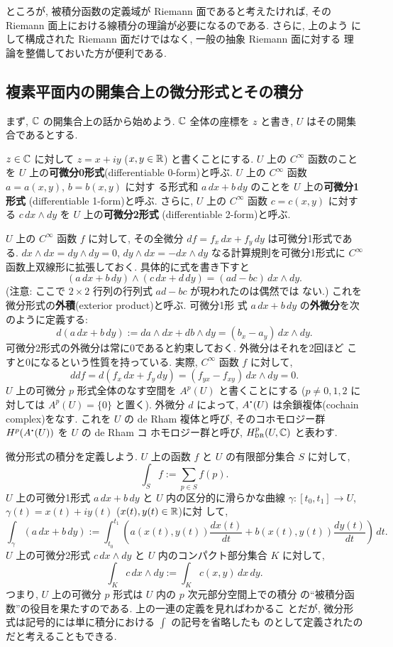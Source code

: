\documentclass[12pt,twoside]{jarticle}
\def\Hdr{H_{\text{\rm DR}}}
\def\bcdot{{\raise0.2ex \hbox{\bf.}}}
\def\bdot{{\raise0.4ex \hbox{\bf.}}}
\def\Hdr{H_{\text{\tiny DR}}}
\def\R{{\Bbb R}} %
\def\C{{\Bbb C}} %
\def\od#1#2{\frac{d #1}{d #2}}
\begin{document}
ところが, 被積分函数の定義域が Riemann 面であると考えたければ, その 
Riemann 面上における線積分の理論が必要になるのである. さらに, 上のよう
にして構成された Riemann 面だけではなく, 一般の抽象 Riemann 面に対する
理論を整備しておいた方が便利である.


\subsection{複素平面内の開集合上の微分形式とその積分}

まず, $\C$ の開集合上の話から始めよう. $\C$ 全体の座標を $z$ と書き,
$U$ はその開集合であるとする.

$z\in\C$ に対して $z=x+iy$ ($x,y\in\R$) と書くことにする. $U$ 上の 
$C^\infty$ 函数のことを $U$ 上の{\bf 可微分0形式}(differentiable
0-form)と呼ぶ. $U$ 上の $C^\infty$ 函数 $a=a(x,y)$, $b=b(x,y)$ に対す
る形式和 $a\,dx + b\,dy$ のことを $U$ 上の{\bf 可微分1形式}
(differentiable 1-form)と呼ぶ. さらに, $U$ 上の $C^\infty$ 函数 
$c=c(x,y)$ に対する $c\,dx\wedge dy$ を $U$ 上の{\bf 可微分2形式}
(differentiable 2-form)と呼ぶ. 

$U$ 上の $C^\infty$ 函数 $f$ に対して, その全微分 $df=f_x\,dx+f_y\,dy$
は可微分1形式である. $dx\wedge dx=dy\wedge dy=0$, %
$dy\wedge dx=-dx\wedge dy$ なる計算規則を可微分1形式に $C^\infty$ %
函数上双線形に拡張しておく. 具体的に式を書き下すと
\[
  (a\,dx+b\,dy)\wedge(c\,dx+d\,dy)
  = (ad-bc)\,dx\wedge dy.
\] %
(注意: ここで $2\times 2$ 行列の行列式 $ad-bc$ が現われたのは偶然では
ない.) これを微分形式の{\bf 外積}(exterior product)と呼ぶ. 可微分1形
式 $a\,dx+b\,dy$ の{\bf 外微分}を次のように定義する:
\[
  d(a\,dx+b\,dy)
  :=da\wedge dx + db\wedge dy
  =(b_x-a_y)\,dx\wedge dy.
\]
可微分2形式の外微分は常に0であると約束しておく. 外微分はそれを2回ほど
こすと0になるという性質を持っている. 実際, $C^\infty$ 函数 $f$ に対して,
\[
  ddf = d(f_x\,dx+f_y\,dy)=(f_{yx}-f_{xy})\,dx\wedge dy = 0.
\] %
$U$ 上の可微分 $p$ 形式全体のなす空間を $A^p(U)$ と書くことにする
($p\ne0,1,2$ に対しては $A^p(U)=\{0\}$ と置く). 外微分 $d$ によって, %
$A^\bdot(U)$ は余鎖複体(cochain complex)をなす. これを $U$ の de Rham
複体と呼び, そのコホモロジー群 $H^p(A^\bcdot(U))$ を $U$ の de Rham コ
ホモロジー群と呼び, $\Hdr^p(U,\C)$ と表わす.

微分形式の積分を定義しよう. $U$ 上の函数 $f$ と $U$ の有限部分集合 $S$
に対して,
\[
  \int_S f := \sum_{p\in S} f(p).
\] %
$U$ 上の可微分1形式 $a\,dx+b\,dy$ と $U$ 内の区分的に滑らかな曲線 %
$\gamma:[t_0,t_1]\to U$, $\gamma(t)=x(t)+iy(t)$ ($x(t),y(t)\in\R$)に対
して,
\[
  \int_\gamma (a\,dx+b\,dy)
  := \int_{t_0}^{t_1}
     \left(
       a(x(t),y(t))\od{x(t)}{t} +
       b(x(t),y(t))\od{y(t)}{t}
     \right)\, dt.
\]
$U$ 上の可微分2形式 $c\,dx\wedge dy$ と $U$ 内のコンパクト部分集合 $K$
に対して,
\[
  \int_K c\,dx\wedge dy
  := \int_K c(x,y)\, dx\,dy.
\] %
つまり, $U$ 上の可微分 $p$ 形式は $U$ 内の $p$ 次元部分空間上での積分
の``被積分函数''の役目を果たすのである. 上の一連の定義を見ればわかるこ
とだが, 微分形式は記号的には単に積分における $\int$ の記号を省略したも
のとして定義されたのだと考えることもできる.
\end{document}
